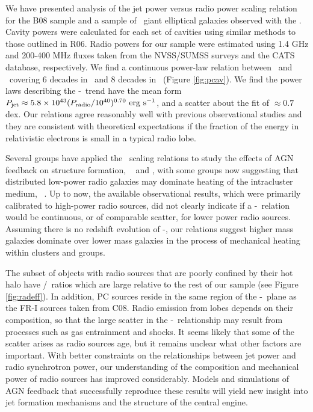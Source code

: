 \documentclass[12pt, preprint]{aastex}
\begin{document}
We have presented analysis of the jet power versus radio power scaling
relation for the B08 sample and a sample of \samp\ giant elliptical
galaxies observed with the \cxo. Cavity powers were calculated for
each set of cavities using similar methods to those outlined in
R06. Radio powers for our sample were estimated using 1.4 GHz and
200-400 MHz fluxes taken from the NVSS/SUMSS surveys and the CATS
database, respectively. We find a continuous power-law relation
between \pjet\ and \prad\ covering 6 decades in \prad\ and 8 decades
in \pjet\ (Figure \ref{fig:pcav}). We find the power laws describing
the \pjet-\prad\ trend have the mean form $P_{\rm{jet}} \approx 5.8 \times
10^{43} (P_{\rm{radio}}/10^{40})^{0.70} ~\rm{\mbox{\ensuremath{\rm{erg}}}~\ensuremath{\rm{\mbox{\ensuremath{\rm{s}}}^{-1}}}}$, and a scatter about the fit of
$\approx 0.7$ dex. Our relations agree reasonably well with previous
observational studies and they are consistent with theoretical
expectations if the fraction of the energy in relativistic electrons
is small in a typical radio lobe.

Several groups have applied the \birzan\ scaling relations to study
the effects of AGN feedback on structure formation,
\eg\ \citet{best07} and \citet{2007MNRAS.379..260M}, with some groups
now suggesting that distributed low-power radio galaxies may dominate
heating of the intracluster medium,
\eg\ \citet{2009ApJ...705..854H}. Up to now, the available
observational results, which were primarily calibrated to high-power
radio sources, did not clearly indicate if a \pjet-\prad\ relation
would be continuous, or of comparable scatter, for lower power radio
sources. Assuming there is no redshift evolution of \pjet-\prad, our
relations suggest higher mass galaxies dominate over lower mass
galaxies in the process of mechanical heating within clusters and
groups.

The subset of objects with radio sources that are poorly confined by
their hot halo have \prad/\pjet\ ratios which are large relative to
the rest of our sample (see Figure \ref{fig:radeff}). In addition, PC
sources reside in the same region of the \pjet-\prad\ plane as the
FR-I sources taken from C08. Radio emission from lobes depends on
their composition, so that the large scatter in the
\pjet-\prad\ relationship may result from processes such as gas
entrainment and shocks. It seems likely that some of the scatter
arises as radio sources age, but it remains unclear what other factors
are important. With better constraints on the relationships between
jet power and radio synchrotron power, our understanding of the
composition and mechanical power of radio sources has improved
considerably. Models and simulations of AGN feedback that successfully
reproduce these results will yield new insight into jet formation
mechanisms and the structure of the central engine.
\end{document}
